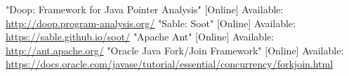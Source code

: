 \documentclass{dithesis}
\begin{document}
\begin{thesisbibliography}[REFERENCES]{99}
		"Doop: Framework for Java Pointer Analysis"
		[Online]
		Available: \url{http://doop.program-analysis.org/}
		"Sable: Soot"
		[Online]
		Available: \url{https://sable.github.io/soot/}
		"Apache Ant"
		[Online]
		Available: \url{http://ant.apache.org/}
        "Oracle Java Fork/Join Framework"
        [Online]
        Available: \url{https://docs.oracle.com/javase/tutorial/essential/concurrency/forkjoin.html}
\end{thesisbibliography}
\end{document}
